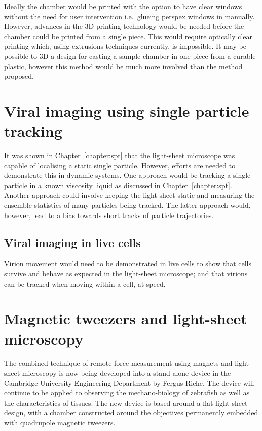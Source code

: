 Ideally the chamber would be printed with the option to have clear windows without the need for user intervention i.e.\ glueing perspex windows in manually.
However, advances in the \gls{3D} printing technology would be needed before the chamber could be printed from a single piece.
This would require optically clear printing which, using extrusions techniques currently, is impossible.
It may be possible to \gls{3D} a design for casting a sample chamber in one piece from a curable plastic, however this method would be much more involved than the method proposed.

\section{Viral imaging using single particle tracking}

It was shown in Chapter~\ref{chapter:spt} that the light-sheet microscope was capable of localising a static single particle.
However, efforts are needed to demonstrate this in dynamic systems.
One approach would be tracking a single particle in a known viscosity liquid as discussed in Chapter~\ref{chapter:spt}.
Another approach could involve keeping the light-sheet static and measuring the ensemble statistics of many particles being tracked.
The latter approach would, however, lead to a bias towards short tracks of particle trajectories.

\subsection{Viral imaging in live cells}

Virion movement would need to be demonstrated in live cells to show that cells survive and behave as expected in the light-sheet microscope; and that virions can be tracked when moving within a cell, at speed.

\section{Magnetic tweezers and light-sheet microscopy}

The combined technique of remote force measurement using magnets and light-sheet microscopy is now being developed into a stand-alone device in the Cambridge University Engineering Department by Fergus Riche.
The device will continue to be applied to observing the mechano-biology of zebrafish as well as the characteristics of tissues. %
The new device is based around a flat light-sheet design, with a chamber constructed around the objectives permanently embedded with quadrupole magnetic tweezers.

